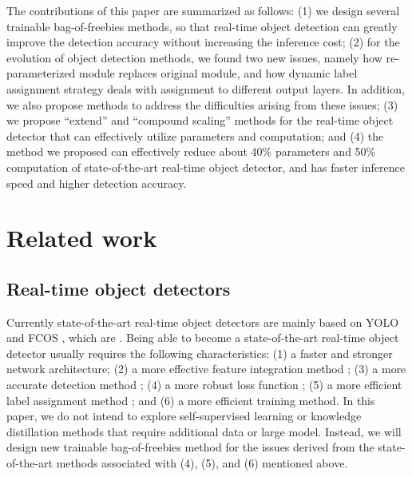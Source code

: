 \documentclass[10pt,twocolumn,letterpaper]{article}
\begin{document}
		The contributions of this paper are summarized as follows: (1) we design several trainable bag-of-freebies methods, so that real-time object detection can greatly improve the detection accuracy without increasing the inference cost; (2) for the evolution of object detection methods, we found two new issues, namely how re-parameterized module replaces original module, and how dynamic label assignment strategy deals with assignment to different output layers. In addition, we also propose methods to address the difficulties arising from these issues; (3) we propose ``extend'' and ``compound scaling'' methods for the real-time object detector that can effectively utilize parameters and computation; and (4) the method we proposed can effectively reduce about 40\% parameters and 50\% computation of state-of-the-art real-time object detector, and has faster inference speed and higher detection accuracy.
		
\section{Related work}
		\label{sec:relw}
		
		
		
		\subsection{Real-time object detectors}
		
		Currently state-of-the-art real-time object detectors are mainly based on YOLO \cite{redmon2016you, redmon2017yolo9000, redmon2018yolov3} and FCOS \cite{tian2019fcos, tian2022fcos}, which are \cite{bochkovskiy2020yolov4, wang2021scaled, wang2021you, ge2021yolox, lyu2021nano, xu2022pp, glenn2022yolov5}. Being able to become a state-of-the-art real-time object detector usually requires the following characteristics: (1) a faster and stronger network architecture; (2) a more effective feature integration method \cite{ghiasi2019fpn, zhou2019objects, kirillov2019panoptic, tan2020efficientdet, qiao2021detectors, hu2021a2, dai2021dynamic, li2022exploring}; (3) a more accurate detection method \cite{tian2019fcos, tian2022fcos, sun2021sparse}; (4) a more robust loss function \cite{zhou2019iou, rezatofighi2019generalized, chen2020ap, oksuz2020ranking, zheng2020distance, oksuz2021rank}; (5) a more efficient label assignment method \cite{zhu2020autoassign, ge2021ota, feng2021tood, wang2021end, li2022dual}; and (6) a more efficient training method. In this paper, we do not intend to explore self-supervised learning or knowledge distillation methods that require additional data or large model. Instead, we will design new trainable bag-of-freebies method for the issues derived from the state-of-the-art methods associated with (4), (5), and (6) mentioned above.
		
\end{document}
